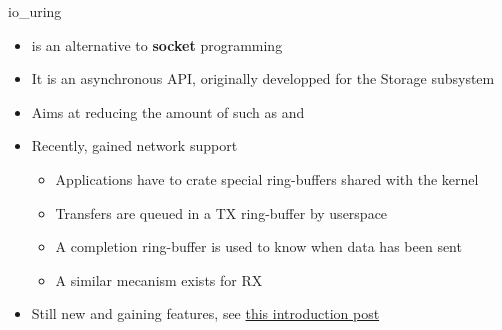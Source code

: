 \begin{frame}{io\_uring}
	\begin{itemize}
		\item {} is an alternative to \textbf{socket} programming
		\item It is an asynchronous API, originally developped for the Storage subsystem
		\item Aims at reducing the amount of  such as  and 
		\item Recently,  gained network support
			\begin{itemize}
				\item Applications have to crate special ring-buffers shared with the kernel
				\item Transfers are queued in a TX ring-buffer by userspace
				\item A completion ring-buffer is used to know when data has been sent
				\item A similar mecanism exists for RX
			\end{itemize}
		\item Still new and gaining features, see \href{https://developers.redhat.com/articles/2023/04/12/why-you-should-use-iouring-network-io}{this introduction post}
	\end{itemize}
\end{frame}

